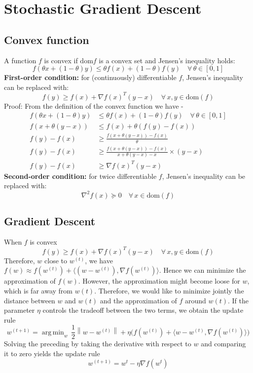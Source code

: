 \documentclass{book}
\DeclareMathOperator*{\argmin}{arg\,min}
\newcommand{\norm}[1]{\left\lVert#1\right\rVert}
\begin{document}
\chapter{Stochastic Gradient Descent}
\section{Convex function}
A function $f$ is convex if $\text{dom} f$ is a convex set and Jensen's inequality holds:
\[ f(\theta x + (1-\theta) y) \leq \theta f(x) + (1-\theta) f(y) \quad \forall \, \theta \in [0,1]\]
\textbf{First-order condition:}
for (continuously) differentiable $f$, Jensen's inequality can be replaced with:
\[ f(y) \geq f(x) + \nabla f(x)^T (y -x) \quad \forall \, x,y \in \text{dom}(f)\]
Proof: From the definition of the convex function we have -
\begin{align*}
f(\theta x + (1-\theta) y) & \leq \theta f(x) + (1-\theta) f(y) \quad \forall \, \theta \in [0,1] \\
f(x + \theta (y-x)) & \leq f(x) + \theta (f(y) - f(x)) \\
f(y) - f(x) & \geq \frac{f(x + \theta (y-x)) - f(x)}{\theta} \\
f(y) - f(x) & \geq \frac{f(x + \theta (y-x)) - f(x)}{x +\theta (y-x) - x} \times (y-x) \\
f(y) - f(x) & \geq \nabla f(x)^T (y-x)
\end{align*}
\textbf{Second-order condition:}
for twice differentiable $f$, Jensen's inequality can be replaced with:
\[ \nabla^2 f(x) \succeq 0 \quad \forall \, x \in \text{dom}(f)\]

\section{Gradient Descent}
When $f$ is convex 
\[ f(y) \geq f(x) + \nabla f(x)^T (y -x) \quad \forall \, x,y \in \text{dom}(f)\]
Therefore, $w$ close to $w^{(t)}$, we have $f(w) \approx f(w^{(t)}) + \langle (w - w^{(t)}), \nabla f(w^{(t)}) \rangle$.
Hence we can minimize the approximation of $f(w)$. However, the approximation might become loose for $w$, which is far away from $w(t)$. Therefore, we would like to minimize jointly the distance between $w$ and $w(t)$ and the approximation of $f$ around $w(t)$. If the parameter $\eta$ controls the tradeoff between the two terms, we obtain the update rule
\[ w^{(t+1)} = \argmin_w \, \frac{1}{2}\norm{w-w^{(t)}} + \eta \Big(f(w^{(t)}) + \langle w - w^{(t)}, \nabla f(w^{(t)}) \rangle\Big)\]
Solving the preceding by taking the derivative with respect to $w$ and comparing it to zero yields the update rule
\[ w^{(t+1)} = w^{t} - \eta \nabla f(w^{t}) \]
\end{document}

